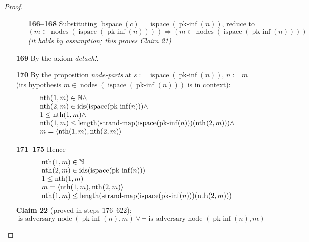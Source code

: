 \documentclass[11pt]{article}
\theoremstyle{plain}
\begin{document}
\begin{proof}
\begin{itemize}[leftmargin=2.8em, itemsep=4pt, parsep=1pt]
  \begin{itemize}[leftmargin=2.8em, itemsep=4pt, parsep=1pt]
  \item[\textbf{166--168}] Substituting $\operatorname{bspace}(c) = \operatorname{ispace}(\operatorname{pk\text{-}inf}(n))$, reduce to
\begin{equation*}
(m \in \operatorname{nodes}(\operatorname{ispace}(\operatorname{pk\text{-}inf}(n)))) \Rightarrow (m \in \operatorname{nodes}(\operatorname{ispace}(\operatorname{pk\text{-}inf}(n))))
\end{equation*}
  \emph{(it holds by assumption; this proves Claim 21)}
  \end{itemize}
  \item[\textbf{169}] By the axiom \emph{detach!}.
  \item[\textbf{170}] By the proposition \emph{node-parts} at $s := \operatorname{ispace}(\operatorname{pk\text{-}inf}(n))$, $n := m$ (its hypothesis $m \in \operatorname{nodes}(\operatorname{ispace}(\operatorname{pk\text{-}inf}(n)))$ is in context):
\begin{equation*}
\begin{array}{@{}l@{}} \operatorname{nth}(1, m) \in \mathbb{N} \wedge \\ \operatorname{nth}(2, m) \in \operatorname{ids}(\operatorname{ispace}(\operatorname{pk\text{-}inf}(n))) \wedge \\ 1 \leq \operatorname{nth}(1, m) \wedge \\ \operatorname{nth}(1, m) \leq \operatorname{length}(\operatorname{strand\text{-}map}(\operatorname{ispace}(\operatorname{pk\text{-}inf}(n)))(\operatorname{nth}(2, m))) \wedge \\ m = \langle \operatorname{nth}(1, m), \operatorname{nth}(2, m) \rangle \end{array}
\end{equation*}

  \item[\textbf{171--175}] Hence 
\begin{equation*}
\begin{array}{@{}l@{}}
\operatorname{nth}(1, m) \in \mathbb{N} \\
\operatorname{nth}(2, m) \in \operatorname{ids}(\operatorname{ispace}(\operatorname{pk\text{-}inf}(n))) \\
1 \leq \operatorname{nth}(1, m) \\
m = \langle \operatorname{nth}(1, m), \operatorname{nth}(2, m) \rangle \\
\operatorname{nth}(1, m) \leq \operatorname{length}(\operatorname{strand\text{-}map}(\operatorname{ispace}(\operatorname{pk\text{-}inf}(n)))(\operatorname{nth}(2, m)))
\end{array}
\end{equation*}
\textbf{Claim 22} (proved in steps 176--622):
\begin{equation*}
\operatorname{is\text{-}adversary\text{-}node}(\operatorname{pk\text{-}inf}(n), m) \vee \neg \operatorname{is\text{-}adversary\text{-}node}(\operatorname{pk\text{-}inf}(n), m)
\end{equation*}


\end{itemize}
\end{proof}
\end{document}

